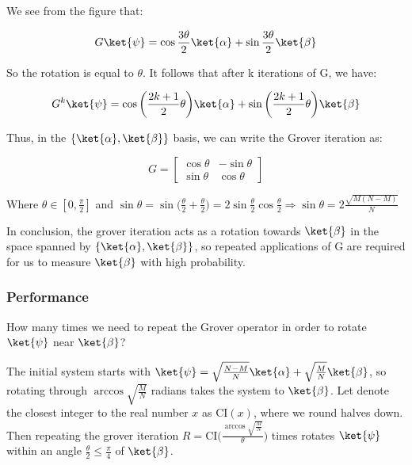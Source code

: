 We see from the figure that:

\begin{equation}
    G \ket{\psi} = \cos \frac{3 \theta}{2} \ket{\alpha} + \sin \frac{3 \theta}{2} \ket{\beta}
\end{equation}

So the rotation is equal to $\theta$. It follows that after k iterations of G, we have:

\begin{equation}
    G^k \ket{\psi} = \cos \bigg( \frac{2k + 1}{2} \theta \bigg) \ket{\alpha} + \sin \bigg( \frac{2k + 1}{2} \theta \bigg) \ket{\beta}
\end{equation}

Thus, in the $\{ \ket{\alpha}, \ket{\beta} \}$ basis, we can write the Grover iteration as:

\begin{equation}
    G = \begin{bmatrix}
    \cos \theta & - \sin \theta \\
    \sin \theta & \cos \theta
    \end{bmatrix}
\end{equation}

Where $\theta \in [0, \frac{\pi}{2}]$ and $\sin \theta = \sin \bigg( \frac{\theta}{2} + \frac{\theta}{2} \bigg) = 2 \sin \frac{\theta}{2} \cos \frac{\theta}{2} \Rightarrow \sin \theta = 2 \frac{\sqrt{M(N-M)}}{N}$

In conclusion, the grover iteration acts as a rotation towards $\ket{\beta}$ in the space spanned by $\{ \ket{\alpha}, \ket{\beta} \}$, so repeated applications of G are required for us to measure $\ket{\beta}$ with high probability.

\subsubsection{Performance}
\label{subsubsec: Grover Performance}
How many times we need to repeat the Grover operator in order to rotate $\ket{\psi}$ near $\ket{\beta}$?

The initial system starts with $\ket{\psi} = \sqrt{\frac{N-M}{N}} \ket{\alpha} + \sqrt{\frac{M}{N}} \ket{\beta}$, so rotating through $\arccos \sqrt{\frac{M}{N}}$ radians takes the system to $\ket{\beta}$. Let denote the closest integer to the real number $x$ as $\mathrm{CI}(x)$, where we round halves down. Then repeating the grover iteration $ R = \mathrm{CI}\bigg( \frac{\arccos \sqrt{\frac{M}{N}}}{\theta} \bigg)$ times rotates $\ket{\psi}$ within an angle $\frac{\theta}{2} \leq \frac{\pi}{4}$ of $\ket{\beta}$.

